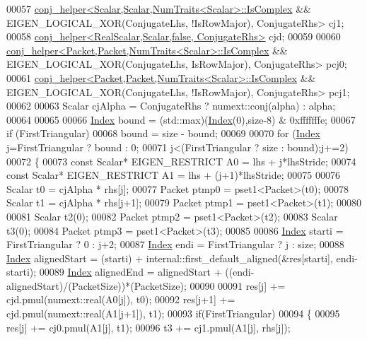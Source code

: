 \begin{DoxyCode}
00057   \hyperlink{struct_eigen_1_1internal_1_1conj__helper}{conj\_helper<Scalar,Scalar,NumTraits<Scalar>::IsComplex}
       && EIGEN\_LOGICAL\_XOR(ConjugateLhs, !IsRowMajor), ConjugateRhs> cj1;
00058   \hyperlink{struct_eigen_1_1internal_1_1conj__helper}{conj\_helper<RealScalar,Scalar,false, ConjugateRhs>} cjd;
00059 
00060   \hyperlink{struct_eigen_1_1internal_1_1conj__helper}{conj\_helper<Packet,Packet,NumTraits<Scalar>::IsComplex}
       && EIGEN\_LOGICAL\_XOR(ConjugateLhs,  IsRowMajor), ConjugateRhs> pcj0;
00061   \hyperlink{struct_eigen_1_1internal_1_1conj__helper}{conj\_helper<Packet,Packet,NumTraits<Scalar>::IsComplex}
       && EIGEN\_LOGICAL\_XOR(ConjugateLhs, !IsRowMajor), ConjugateRhs> pcj1;
00062 
00063   Scalar cjAlpha = ConjugateRhs ? numext::conj(alpha) : alpha;
00064 
00065 
00066   \hyperlink{namespace_eigen_a62e77e0933482dafde8fe197d9a2cfde}{Index} bound = (std::max)(\hyperlink{namespace_eigen_a62e77e0933482dafde8fe197d9a2cfde}{Index}(0),size-8) & 0xfffffffe;
00067   \textcolor{keywordflow}{if} (FirstTriangular)
00068     bound = size - bound;
00069 
00070   \textcolor{keywordflow}{for} (\hyperlink{namespace_eigen_a62e77e0933482dafde8fe197d9a2cfde}{Index} j=FirstTriangular ? bound : 0;
00071        j<(FirstTriangular ? size : bound);j+=2)
00072   \{
00073     \textcolor{keyword}{const} Scalar* EIGEN\_RESTRICT A0 = lhs + j*lhsStride;
00074     \textcolor{keyword}{const} Scalar* EIGEN\_RESTRICT A1 = lhs + (j+1)*lhsStride;
00075 
00076     Scalar t0 = cjAlpha * rhs[j];
00077     Packet ptmp0 = pset1<Packet>(t0);
00078     Scalar t1 = cjAlpha * rhs[j+1];
00079     Packet ptmp1 = pset1<Packet>(t1);
00080 
00081     Scalar t2(0);
00082     Packet ptmp2 = pset1<Packet>(t2);
00083     Scalar t3(0);
00084     Packet ptmp3 = pset1<Packet>(t3);
00085 
00086     \hyperlink{namespace_eigen_a62e77e0933482dafde8fe197d9a2cfde}{Index} starti = FirstTriangular ? 0 : j+2;
00087     \hyperlink{namespace_eigen_a62e77e0933482dafde8fe197d9a2cfde}{Index} endi   = FirstTriangular ? j : size;
00088     \hyperlink{namespace_eigen_a62e77e0933482dafde8fe197d9a2cfde}{Index} alignedStart = (starti) + internal::first\_default\_aligned(&res[starti], endi-starti);
00089     \hyperlink{namespace_eigen_a62e77e0933482dafde8fe197d9a2cfde}{Index} alignedEnd = alignedStart + ((endi-alignedStart)/(PacketSize))*(PacketSize);
00090 
00091     res[j]   += cjd.pmul(numext::real(A0[j]), t0);
00092     res[j+1] += cjd.pmul(numext::real(A1[j+1]), t1);
00093     \textcolor{keywordflow}{if}(FirstTriangular)
00094     \{
00095       res[j]   += cj0.pmul(A1[j],   t1);
00096       t3       += cj1.pmul(A1[j],   rhs[j]);

\end{DoxyCode}
